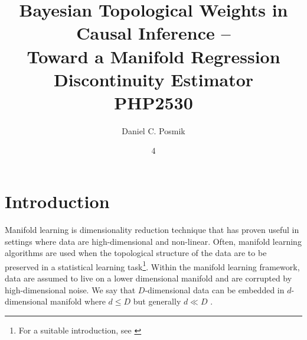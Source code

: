 \documentclass[twoside,11pt]{article}
\begin{document}
\title{Bayesian Topological Weights in Causal Inference -- \\ Toward a Manifold Regression Discontinuity Estimator \\
\vspace{.1in}
PHP2530			
}

\author{ Daniel C. Posmik }

\maketitle
\date{4 }

\section{Introduction} \label{sc:intro}

Manifold learning is dimensionality reduction technique that has proven useful in settings where data are high-dimensional and non-linear. Often, manifold learning algorithms are used when the topological structure of the data are to be preserved in a statistical learning task\footnote{For a suitable introduction, see \citet{Meila2023}}. Within the manifold learning framework, data are assumed to live on a lower dimensional manifold and are corrupted by high-dimensional noise. We say that $D$-dimensional data can be embedded in $d$-dimensional manifold where $d \leq D$ but generally $d \ll D$ .  
\end{document}
